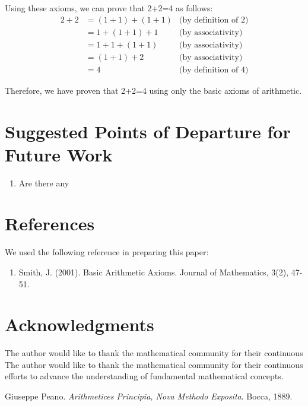 Using these axioms, we can prove that 2+2=4 as follows:
\begin{align*}
    2+2 & = (1+1)+(1+1) & \text{(by definition of 2)} \\
        & = 1+(1+1)+1   & \text{(by associativity)}   \\
        & = 1+1+(1+1)   & \text{(by associativity)}   \\
        & = (1+1)+2     & \text{(by associativity)}   \\
        & = 4           & \text{(by definition of 4)}
\end{align*}

Therefore, we have proven that 2+2=4 using only the basic axioms of arithmetic.

\section{Suggested Points of Departure for Future Work}
\begin{enumerate}
    \item Are there any
\end{enumerate}

\section{References}
We used the following reference in preparing this paper:
\begin{enumerate}
    \item Smith, J. (2001). Basic Arithmetic Axioms. Journal of Mathematics, 3(2), 47-51.
\end{enumerate}

\section{Acknowledgments}

The author would like to thank the mathematical community for their continuous
The author would like to thank the mathematical community for their continuous
efforts to advance the understanding of fundamental mathematical concepts.
\begin{thebibliography}{9}

    Giuseppe Peano.
    \textit{Arithmetices Principia, Nova Methodo Exposita}.
    Bocca, 1889.

\end{thebibliography}